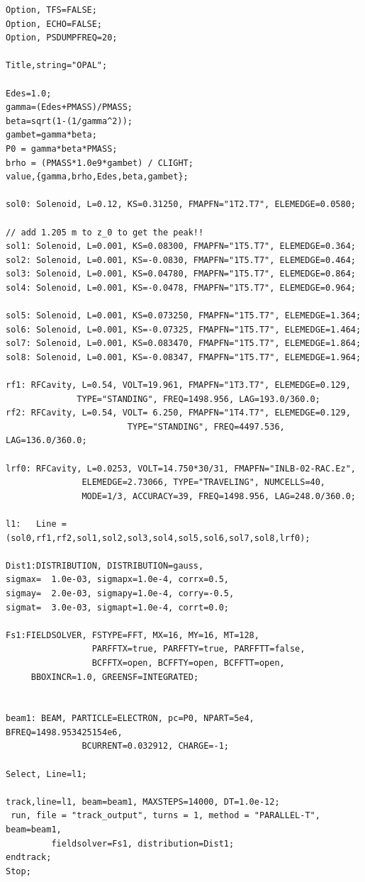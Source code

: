 \documentclass{psi-note}    %
\begin{document}
\begin{verbatim}
Option, TFS=FALSE;
Option, ECHO=FALSE;
Option, PSDUMPFREQ=20;

Title,string="OPAL";

Edes=1.0;
gamma=(Edes+PMASS)/PMASS;
beta=sqrt(1-(1/gamma^2));
gambet=gamma*beta;
P0 = gamma*beta*PMASS;
brho = (PMASS*1.0e9*gambet) / CLIGHT;
value,{gamma,brho,Edes,beta,gambet};

sol0: Solenoid, L=0.12, KS=0.31250, FMAPFN="1T2.T7", ELEMEDGE=0.0580;

// add 1.205 m to z_0 to get the peak!!
sol1: Solenoid, L=0.001, KS=0.08300, FMAPFN="1T5.T7", ELEMEDGE=0.364;
sol2: Solenoid, L=0.001, KS=-0.0830, FMAPFN="1T5.T7", ELEMEDGE=0.464;
sol3: Solenoid, L=0.001, KS=0.04780, FMAPFN="1T5.T7", ELEMEDGE=0.864;
sol4: Solenoid, L=0.001, KS=-0.0478, FMAPFN="1T5.T7", ELEMEDGE=0.964;

sol5: Solenoid, L=0.001, KS=0.073250, FMAPFN="1T5.T7", ELEMEDGE=1.364;
sol6: Solenoid, L=0.001, KS=-0.07325, FMAPFN="1T5.T7", ELEMEDGE=1.464;
sol7: Solenoid, L=0.001, KS=0.083470, FMAPFN="1T5.T7", ELEMEDGE=1.864;
sol8: Solenoid, L=0.001, KS=-0.08347, FMAPFN="1T5.T7", ELEMEDGE=1.964;

rf1: RFCavity, L=0.54, VOLT=19.961, FMAPFN="1T3.T7", ELEMEDGE=0.129, 
   		      TYPE="STANDING", FREQ=1498.956, LAG=193.0/360.0;
rf2: RFCavity, L=0.54, VOLT= 6.250, FMAPFN="1T4.T7", ELEMEDGE=0.129, 
                        TYPE="STANDING", FREQ=4497.536, LAG=136.0/360.0;

lrf0: RFCavity, L=0.0253, VOLT=14.750*30/31, FMAPFN="INLB-02-RAC.Ez", 
		       ELEMEDGE=2.73066, TYPE="TRAVELING", NUMCELLS=40, 
		       MODE=1/3, ACCURACY=39, FREQ=1498.956, LAG=248.0/360.0;

l1:   Line = (sol0,rf1,rf2,sol1,sol2,sol3,sol4,sol5,sol6,sol7,sol8,lrf0);

Dist1:DISTRIBUTION, DISTRIBUTION=gauss,
sigmax=  1.0e-03, sigmapx=1.0e-4, corrx=0.5,
sigmay=  2.0e-03, sigmapy=1.0e-4, corry=-0.5,
sigmat=  3.0e-03, sigmapt=1.0e-4, corrt=0.0;

Fs1:FIELDSOLVER, FSTYPE=FFT, MX=16, MY=16, MT=128,
                 PARFFTX=true, PARFFTY=true, PARFFTT=false,
                 BCFFTX=open, BCFFTY=open, BCFFTT=open,
     BBOXINCR=1.0, GREENSF=INTEGRATED;


beam1: BEAM, PARTICLE=ELECTRON, pc=P0, NPART=5e4, BFREQ=1498.953425154e6, 
               BCURRENT=0.032912, CHARGE=-1;

Select, Line=l1;

track,line=l1, beam=beam1, MAXSTEPS=14000, DT=1.0e-12;
 run, file = "track_output", turns = 1, method = "PARALLEL-T", beam=beam1, 
         fieldsolver=Fs1, distribution=Dist1;
endtrack;
Stop;

\end{verbatim}
\end{document}
